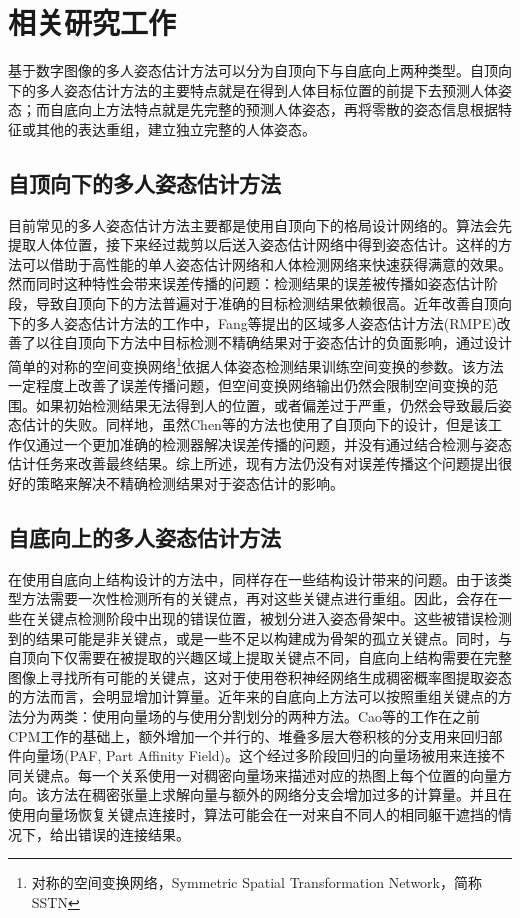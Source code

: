 \section{相关研究工作}
\label{sec:related_work}
基于数字图像的多人姿态估计方法可以分为自顶向下与自底向上两种类型。自顶向下的多人姿态估计方法的主要特点就是在得到人体目标位置的前提下去预测人体姿态；而自底向上方法特点就是先完整的预测人体姿态，再将零散的姿态信息根据特征或其他的表达重组，建立独立完整的人体姿态。

\subsection{自顶向下的多人姿态估计方法}
\label{subsec:topdown}
目前常见的多人姿态估计方法主要都是使用自顶向下的格局设计网络的。算法会先提取人体位置，接下来经过裁剪以后送入姿态估计网络中得到姿态估计。这样的方法可以借助于高性能的单人姿态估计网络和人体检测网络来快速获得满意的效果。然而同时这种特性会带来误差传播的问题：检测结果的误差被传播如姿态估计阶段，导致自顶向下的方法普遍对于准确的目标检测结果依赖很高。近年改善自顶向下的多人姿态估计方法的工作中，Fang等提出的区域多人姿态估计方法\cite{fang2017rmpe}(RMPE)改善了以往自顶向下方法中目标检测不精确结果对于姿态估计的负面影响，通过设计简单的对称的空间变换网络\footnote{对称的空间变换网络，Symmetric Spatial Transformation Network，简称SSTN}依据人体姿态检测结果训练空间变换的参数。该方法一定程度上改善了误差传播问题，但空间变换网络输出仍然会限制空间变换的范围。如果初始检测结果无法得到人的位置，或者偏差过于严重，仍然会导致最后姿态估计的失败。同样地，虽然Chen等的方法\cite{Chen2017Cascaded}也使用了自顶向下的设计，但是该工作仅通过一个更加准确的检测器解决误差传播的问题，并没有通过结合检测与姿态估计任务来改善最终结果。综上所述，现有方法仍没有对误差传播这个问题提出很好的策略来解决不精确检测结果对于姿态估计的影响。

\subsection{自底向上的多人姿态估计方法}
\label{subsec:bottomup}
在使用自底向上结构设计的方法中，同样存在一些结构设计带来的问题。由于该类型方法需要一次性检测所有的关键点，再对这些关键点进行重组。因此，会存在一些在关键点检测阶段中出现的错误位置，被划分进入姿态骨架中。这些被错误检测到的结果可能是非关键点，或是一些不足以构建成为骨架的孤立关键点。同时，与自顶向下仅需要在被提取的兴趣区域上提取关键点不同，自底向上结构需要在完整图像上寻找所有可能的关键点，这对于使用卷积神经网络生成稠密概率图提取姿态的方法而言，会明显增加计算量。近年来的自底向上方法可以按照重组关键点的方法分为两类：使用向量场的与使用分割划分的两种方法。Cao等的工作\cite{Cao2016Realtime}在之前CPM工作的基础上，额外增加一个并行的、堆叠多层大卷积核的分支用来回归部件向量场(PAF, Part Affinity Field)。这个经过多阶段回归的向量场被用来连接不同关键点。每一个关系使用一对稠密向量场来描述对应的热图上每个位置的向量方向。该方法在稠密张量上求解向量与额外的网络分支会增加过多的计算量。并且在使用向量场恢复关键点连接时，算法可能会在一对来自不同人的相同躯干遮挡的情况下，给出错误的连接结果。

